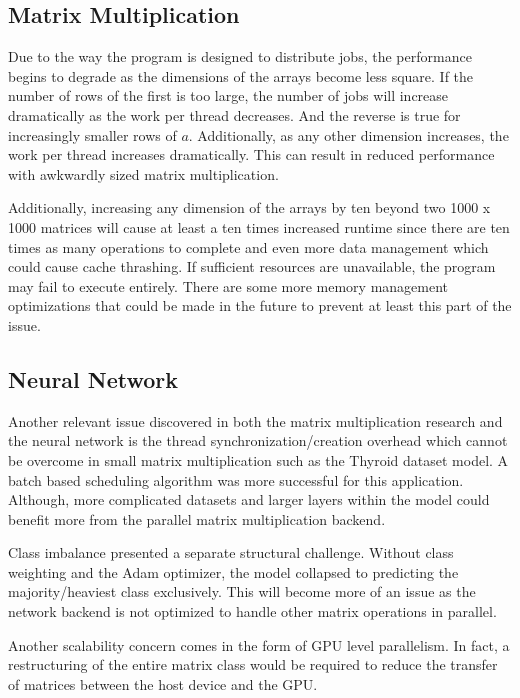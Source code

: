 \documentclass[journal]{IEEEtran}
\begin{document}
\subsection{Matrix Multiplication}
\par Due to the way the program is designed to distribute jobs, the performance begins to degrade as the dimensions of the arrays become less square. If the number of rows of the first is too large, the number of jobs will increase dramatically as the work per thread decreases. And the reverse is true for increasingly smaller rows of $a$. Additionally, as any other dimension increases, the work per thread increases dramatically. This can result in reduced performance with awkwardly sized matrix multiplication.
\par Additionally, increasing any dimension of the arrays by ten beyond two 1000 x 1000 matrices will cause at least a ten times increased runtime since there are ten times as many operations to complete and even more data management which could cause cache thrashing. If sufficient resources are unavailable, the program may fail to execute entirely. There are some more memory management optimizations that could be made in the future to prevent at least this part of the issue.
\subsection{Neural Network}
\par Another relevant issue discovered in both the matrix multiplication research and the neural network is the thread synchronization/creation overhead which cannot be overcome in small matrix multiplication such as the Thyroid dataset model. A batch based scheduling algorithm was more successful for this application. Although, more complicated datasets and larger layers within the model could benefit more from the parallel matrix multiplication backend. 
\par Class imbalance presented a separate structural challenge. Without class weighting and the Adam optimizer, the model collapsed to predicting the majority/heaviest class exclusively. This will become more of an issue as the network backend is not optimized to handle other matrix operations in parallel. 
\par Another scalability concern comes in the form of GPU level parallelism. In fact, a restructuring of the entire matrix class would be required to reduce the transfer of matrices between the host device and the GPU.
\end{document}
